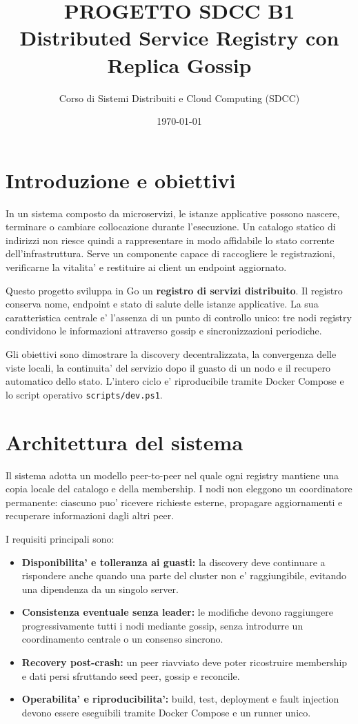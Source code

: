 \documentclass[conference]{IEEEtran}
\title{PROGETTO SDCC B1 \\
\large Distributed Service Registry con Replica Gossip}
\author{Corso di Sistemi Distribuiti e Cloud Computing (SDCC)}
\date{\today}
\begin{document}
\maketitle

\section{Introduzione e obiettivi}
In un sistema composto da microservizi, le istanze applicative possono nascere, terminare o cambiare collocazione durante l'esecuzione. Un catalogo statico di indirizzi non riesce quindi a rappresentare in modo affidabile lo stato corrente dell'infrastruttura. Serve un componente capace di raccogliere le registrazioni, verificarne la vitalita' e restituire ai client un endpoint aggiornato.

Questo progetto sviluppa in Go un \textbf{registro di servizi distribuito}. Il registro conserva nome, endpoint e stato di salute delle istanze applicative. La sua caratteristica centrale e' l'assenza di un punto di controllo unico: tre nodi registry condividono le informazioni attraverso gossip e sincronizzazioni periodiche.

Gli obiettivi sono dimostrare la discovery decentralizzata, la convergenza delle viste locali, la continuita' del servizio dopo il guasto di un nodo e il recupero automatico dello stato. L'intero ciclo e' riproducibile tramite Docker Compose e lo script operativo \texttt{scripts/dev.ps1}.

\section{Architettura del sistema}
Il sistema adotta un modello peer-to-peer nel quale ogni registry mantiene una copia locale del catalogo e della membership. I nodi non eleggono un coordinatore permanente: ciascuno puo' ricevere richieste esterne, propagare aggiornamenti e recuperare informazioni dagli altri peer.

I requisiti principali sono:

\begin{itemize}[leftmargin=1.2cm]
  \item \textbf{Disponibilita' e tolleranza ai guasti:} la discovery deve continuare a rispondere anche quando una parte del cluster non e' raggiungibile, evitando una dipendenza da un singolo server.
  \item \textbf{Consistenza eventuale senza leader:} le modifiche devono raggiungere progressivamente tutti i nodi mediante gossip, senza introdurre un coordinamento centrale o un consenso sincrono.
  \item \textbf{Recovery post-crash:} un peer riavviato deve poter ricostruire membership e dati persi sfruttando seed peer, gossip e reconcile.
  \item \textbf{Operabilita' e riproducibilita':} build, test, deployment e fault injection devono essere eseguibili tramite Docker Compose e un runner unico.
\end{itemize}
\end{document}
